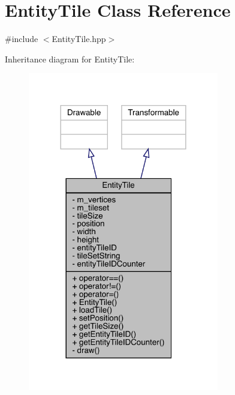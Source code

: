 \hypertarget{class_entity_tile}{}\section{Entity\+Tile Class Reference}
\label{class_entity_tile}


{\ttfamily \#include $<$Entity\+Tile.\+hpp$>$}



Inheritance diagram for Entity\+Tile\+:
\nopagebreak
\begin{figure}[H]
\begin{center}
\leavevmode
\includegraphics[width=236pt]{d0/d94/class_entity_tile__inherit__graph}
\end{center}
\end{figure}


